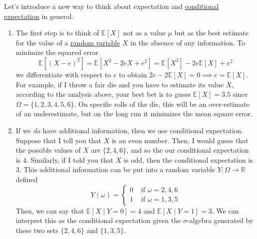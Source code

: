 	\begin{example}
		Let's introduce a new way to think about expectation and \hyperref[def:cond-exp]{conditional expectation} in general. 
		\begin{enumerate}
			\item The first step is to think of $\mathbb{E}[X]$ not as a value $\mu$ but as the best estimate for the value of a \hyperref[def:random-variable]{random variable} $X$ in the absence of any information. To minimize the squared error 
			\begin{equation}
				\mathbb{E}[ (X - e)^2] = \mathbb{E}[ X^2 - 2 e X + e^2] = \mathbb{E}[X^2] - 2 e \mathbb{E}[X] + e^2
			\end{equation}
			we differentiate with respect to $e$ to obtain $2e - 2 \mathbb{E}[X] = 0 \implies e = \mathbb{E}[X]$. For example, if I throw a fair die and you have to estimate its value $X$, according to the analysis above, your best bet is to guess $\mathbb{E}[X] = 3.5$ since $\Omega = \{1, 2, 3, 4, 5, 6\}$. On specific rolls of the die, this will be an over-estimate of an underestimate, but on the long run it minimizes the mean square error. 
			
			\item If we \textit{do} have additional information, then we use conditional expectation. Suppose that I tell you that $X$ is an even number. Then, I would guess that the possible values of $X$ are $\{2, 4, 6\}$, and so the our conditional expectation is $4$. Similarly, if I told you that $X$ is odd, then the conditional expectation is $3$. This additional information can be put into a random variable $Y: \Omega \rightarrow \mathbb{R}$ defined 
			\begin{equation}
				Y(\omega) = \begin{cases} 0 & \text{ if } \omega = 2, 4, 6 \\ 1 & \text{ if } \omega = 1, 3, 5 \end{cases}
			\end{equation}
			Then, we can say that $\mathbb{E}[X \mid Y = 0] = 4$ and $\mathbb{E}[X \mid Y = 1] = 3$. We can interpret this as the conditional expectation given the $\sigma$-algebra generated by these two sets $\{2, 4, 6\}$ and $\{1, 3, 5\}$. 
			

\end{enumerate}
\end{example}
